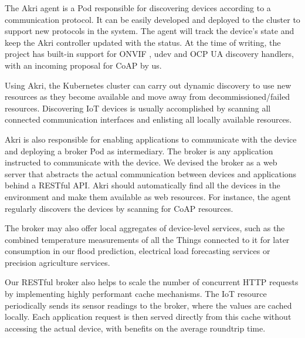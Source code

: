 The Akri agent is a Pod responsible for discovering devices according to a communication protocol. It can be easily developed and deployed to the cluster to support new protocols in the system. The agent will track the device's state and keep the Akri controller updated with the status. At the time of writing, the project has built-in support for ONVIF \cite{onvif}, udev \cite{udev} and OCP UA \cite{gruner2016restful} discovery handlers, with an incoming proposal for CoAP \cite{bormann2012coap} by us.

Using Akri, the Kubernetes cluster can carry out dynamic discovery to use new resources as they become available and move away from decommissioned/failed resources. Discovering IoT devices is usually accomplished by scanning all connected communication interfaces and enlisting all locally available resources.

Akri is also responsible for enabling applications to communicate with the device and deploying a broker Pod as intermediary. The broker is any application instructed to communicate with the device. We devised the broker as a web server that abstracts the actual communication between devices and applications behind a RESTful API. Akri should automatically find all the devices in the environment and make them available as web resources. For instance, the agent regularly discovers the devices by scanning for CoAP resources.

The broker may also offer local aggregates of device-level services, such as the combined temperature measurements of all the Things connected to it for later consumption in our flood prediction, electrical load forecasting services or precision agriculture services.

Our RESTful broker also helps to scale the number of concurrent HTTP requests by implementing highly performant cache mechanisms. The IoT resource periodically sends its sensor readings to the broker, where the values are cached locally. Each application request is then served directly from this cache without accessing the actual device, with benefits on the average roundtrip time.


